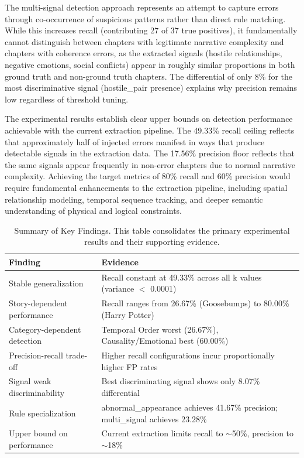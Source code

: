 The multi-signal detection approach represents an attempt to capture errors through co-occurrence of suspicious patterns rather than direct rule matching. While this increases recall (contributing 27 of 37 true positives), it fundamentally cannot distinguish between chapters with legitimate narrative complexity and chapters with coherence errors, as the extracted signals (hostile relationships, negative emotions, social conflicts) appear in roughly similar proportions in both ground truth and non-ground truth chapters. The differential of only 8\% for the most discriminative signal (hostile\_pair presence) explains why precision remains low regardless of threshold tuning.

The experimental results establish clear upper bounds on detection performance achievable with the current extraction pipeline. The 49.33\% recall ceiling reflects that approximately half of injected errors manifest in ways that produce detectable signals in the extraction data. The 17.56\% precision floor reflects that the same signals appear frequently in non-error chapters due to normal narrative complexity. Achieving the target metrics of 80\% recall and 60\% precision would require fundamental enhancements to the extraction pipeline, including spatial relationship modeling, temporal sequence tracking, and deeper semantic understanding of physical and logical constraints.

\begin{table}[htbp]
\centering
\caption{Summary of Key Findings. This table consolidates the primary experimental results and their supporting evidence.}
\label{tab:summary_findings}
\begin{tabular}{lp{10cm}}
\toprule
\textbf{Finding} & \textbf{Evidence} \\
\midrule
Stable generalization & Recall constant at 49.33\% across all k values (variance $<$ 0.0001) \\
Story-dependent performance & Recall ranges from 26.67\% (Goosebumps) to 80.00\% (Harry Potter) \\
Category-dependent detection & Temporal Order worst (26.67\%), Causality/Emotional best (60.00\%) \\
Precision-recall trade-off & Higher recall configurations incur proportionally higher FP rates \\
Signal weak discriminability & Best discriminating signal shows only 8.07\% differential \\
Rule specialization & abnormal\_appearance achieves 41.67\% precision; multi\_signal achieves 23.28\% \\
Upper bound on performance & Current extraction limits recall to $\sim$50\%, precision to $\sim$18\% \\
\bottomrule
\end{tabular}
\end{table}

